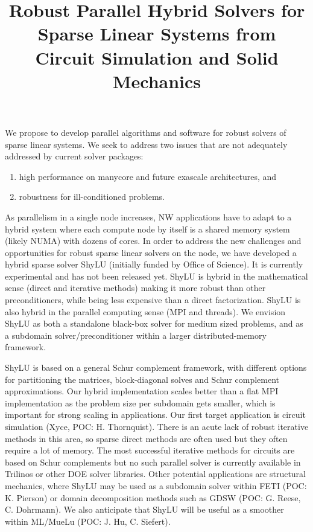 \documentclass[10pt]{amsart}
\date{}
\title{Robust Parallel Hybrid Solvers for Sparse Linear Systems
from Circuit Simulation and Solid Mechanics}
\begin{document}
\maketitle

\vspace{-4mm}
We propose to develop parallel algorithms and software for robust solvers
of sparse linear systems. We seek to address two issues that
are not adequately addressed by current solver packages:
\begin{enumerate}
\item high performance on manycore and future exascale architectures, and
\item robustness for ill-conditioned problems.
\end{enumerate}

As parallelism in a single node increases, NW applications
have to adapt to a hybrid system where each compute node by itself
is a shared memory system (likely NUMA) with dozens of cores. 
In order to address the new challenges and opportunities 
for robust sparse linear solvers on the node,
we have developed a hybrid sparse solver ShyLU (initially funded by 
Office of Science). It is currently experimental and
has not been released yet. ShyLU is hybrid in the
mathematical sense (direct and iterative methods) making it more
robust than other preconditioners, while being less expensive
than a direct factorization.  ShyLU is also hybrid in the parallel
computing sense (MPI and threads). We envision ShyLU as both
a standalone black-box solver for medium sized problems,
and as a subdomain solver/preconditioner within a larger 
distributed-memory framework. 

ShyLU is based on a general Schur complement framework, with different options
for partitioning the matrices, block-diagonal solves and Schur complement
approximations.  Our hybrid implementation scales better than
a flat MPI implementation as the problem size per subdomain gets smaller, 
which is important for strong scaling in applications.
Our first target application is circuit simulation (Xyce, POC: H. Thornquist). 
There is an acute lack of robust iterative methods in this area, so sparse
direct methods are often used but they often require a lot of memory.
The most successful iterative methods
for circuits are based on Schur complements but no such parallel solver
is currently available in Trilinos or other DOE solver libraries.
%
Other potential applications are structural mechanics, where ShyLU
may be used as a subdomain solver within FETI (POC: K. Pierson) or
domain decomposition methods such as GDSW (POC: G. Reese, C. Dohrmann). 
We also anticipate that ShyLU
will be useful as a smoother within ML/MueLu (POC: J. Hu, C. Siefert).
\end{document}
